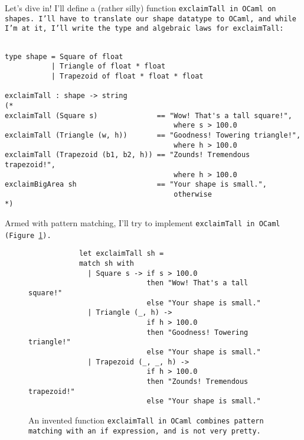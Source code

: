 \documentclass[manuscript,screen,review, 12pt, nonacm]{acmart}
\begin{document}
    Let's dive in! I'll define a (rather silly) function \tt{exclaimTall} in
    OCaml on \tt{shape}s. I'll have to translate our \tt{shape} datatype to
    OCaml, and while I'm at it, I'll write the type and algebraic laws for
    \tt{exclaimTall}:

    \begin{minipage}[t]{\textwidth}        
        \centering 
        \begin{verbatim}

type shape = Square of float 
           | Triangle of float * float
           | Trapezoid of float * float * float

exclaimTall : shape -> string 
(*
exclaimTall (Square s)              == "Wow! That's a tall square!", 
                                        where s > 100.0
exclaimTall (Triangle (w, h))       == "Goodness! Towering triangle!",
                                        where h > 100.0
exclaimTall (Trapezoid (b1, b2, h)) == "Zounds! Tremendous trapezoid!", 
                                        where h > 100.0
exclaimBigArea sh                   == "Your shape is small.", 
                                        otherwise
*)
    \end{verbatim}
    \end{minipage}

    Armed with pattern matching, I'll try to implement \tt{exclaimTall} in OCaml
    (Figure~\ref{fig:ifexclaimtall}).

    \begin{figure}[ht]
        \begin{verbatim}
            let exclaimTall sh =
            match sh with 
              | Square s -> if s > 100.0 
                            then "Wow! That's a tall square!"
                            else "Your shape is small." 
              | Triangle (_, h) -> 
                            if h > 100.0 
                            then "Goodness! Towering triangle!"
                            else "Your shape is small." 
              | Trapezoid (_, _, h) -> 
                            if h > 100.0
                            then "Zounds! Tremendous trapezoid!"
                            else "Your shape is small." 
            \end{verbatim}    
        \caption{An invented function \tt{exclaimTall} in OCaml combines pattern
        matching with an \tt{if} expression, and is not very pretty.}   
        \label{fig:ifexclaimtall}
    \end{figure}
    
\end{document}
